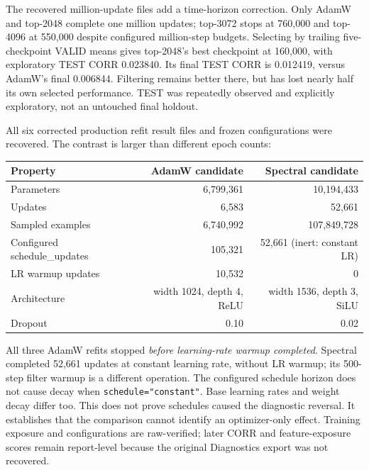 \documentclass[
  british,
  10pt,
  a4paper,
]{article}
\newcounter{none} %
\begin{document}
The recovered million-\allowbreak{}update files add a
time-\allowbreak{}horizon correction.\allowbreak{} Only AdamW and
top-2048 complete one million updates; top-3072 stops at 760,000 and
top-4096 at 550,000 despite configured million-\allowbreak{}step
budgets. Selecting by trailing five-\allowbreak{}checkpoint VALID means
gives top-2048's best checkpoint at 160,000, with exploratory TEST CORR
0.023840. Its final TEST CORR is 0.012419, versus AdamW's final
0.006844. Filtering remains better there, but has lost nearly half its
own selected performance.\allowbreak{} TEST was repeatedly observed and
explicitly exploratory,\allowbreak{} not an untouched final holdout.

All six corrected production refit result files and frozen
configurations were recovered. The contrast is larger than different
epoch counts:

{\def\LTcaptype{none} %
\begin{longtable}[]{@{}lrr@{}}
\toprule\noalign{}
Property & AdamW candidate & Spectral candidate \\
\midrule\noalign{}
\endhead
\bottomrule\noalign{}
\endlastfoot
Parameters & 6,799,361 & 10,194,433 \\
Updates & 6,583 & 52,661 \\
Sampled examples & 6,740,992 & 107,\allowbreak{}849,\allowbreak{}728 \\
Configured schedule\_updates & 105,321 & 52,661 (inert: constant LR) \\
LR warmup updates & 10,532 & 0 \\
Architecture & width 1024, depth 4, ReLU & width 1536, depth 3, SiLU \\
Dropout & 0.10 & 0.02 \\
\end{longtable}
}

All three AdamW refits stopped \emph{before learning-\allowbreak{}rate
warmup completed}. Spectral completed 52,661 updates at constant
learning rate, without LR warmup; its 500-step filter warmup is a
different operation. The configured schedule horizon does not cause
decay when \texttt{schedule=\allowbreak{}"constant"}. Base learning
rates and weight decay differ too. This does not prove schedules caused
the diagnostic reversal. It establishes that the comparison cannot
identify an optimizer-\allowbreak{}only effect. Training exposure and
configurations are raw-\allowbreak{}verified; later CORR and
feature-\allowbreak{}exposure scores remain report-\allowbreak{}level
because the original Diagnostics export was not recovered.
\end{document}
